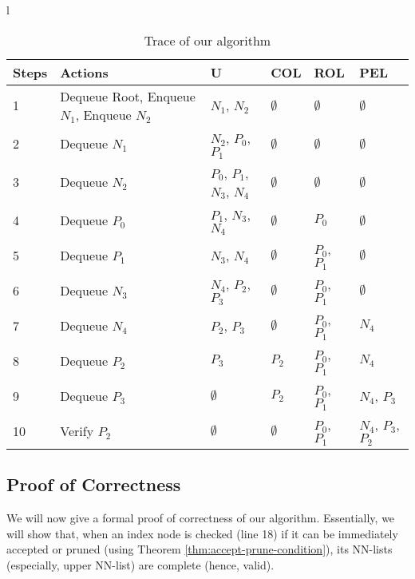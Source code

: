 \documentclass[prodmode,letterpaper]{acmsmall}
\begin{document}
\begin{table}[tp]
\begin{tabular}{l}
\begin{minipage}[t]{\linewidth}
\begin{center}
\caption{Trace of our algorithm \label{Tab:our_algo}}
    \begin{tabular}{ |l| p{4cm} | l | l | l | p{2cm} |}
    \hline
    \bfseries{Steps} & \bfseries{Actions} & \bfseries{U}& \textbf{COL} & \textbf{ROL} & \textbf{PEL} \\ \hline
    1 & Dequeue Root, Enqueue $N_1$, Enqueue $N_2$ & $N_1$, $N_2$ &$\emptyset$&$\emptyset$&$\emptyset$\\ \hline
	2 & Dequeue $N_1$ & $N_2$, $P_0$, $P_1$ & $\emptyset$&$\emptyset$&$\emptyset$\\ \hline
	3 & Dequeue $N_2$ & $P_0$, $P_1$, $N_3$, $N_4$ &$\emptyset$&$\emptyset$ & $\emptyset$ \\ \hline
	4 & Dequeue $P_0$& $P_1$, $N_3$, $N_4$ &$\emptyset$&$P_0$& $\emptyset$\\ \hline
	5 & Dequeue $P_1$& $N_3$, $N_4$ &$\emptyset$&$P_0$, $P_1$& $\emptyset$\\ \hline
	6 & Dequeue $N_3$& $N_4$, $P_2$, $P_3$ &$\emptyset$&$P_0$, $P_1$& $\emptyset$\\ \hline
	7 & Dequeue $N_4$& $P_2$, $P_3$ &$\emptyset$&$P_0$, $P_1$& $N_4$\\ \hline
    8 & Dequeue $P_2$& $P_3$ &$P_2$&$P_0$, $P_1$& $N_4$\\ \hline
    9 & Dequeue $P_3$& $\emptyset$ &$P_2$&$P_0$, $P_1$& $N_4$, $P_3$\\ \hline
    10 & Verify $P_2$& $\emptyset$ &$\emptyset$&$P_0$, $P_1$& $N_4$, $P_3$, $P_2$\\ \hline
    \end{tabular}
\end{center}
\end{minipage}
 \end{tabular}
\end{table} 

 
\subsection{Proof of Correctness}\label{section:proof}
We will now give a formal proof of correctness of our algorithm. Essentially, we
will show that, when an index node is checked (line 18) if it can be immediately accepted
or pruned (using Theorem \ref{thm:accept-prune-condition}),
its NN-lists (especially, upper NN-list) are complete (hence, valid).
\end{document}
